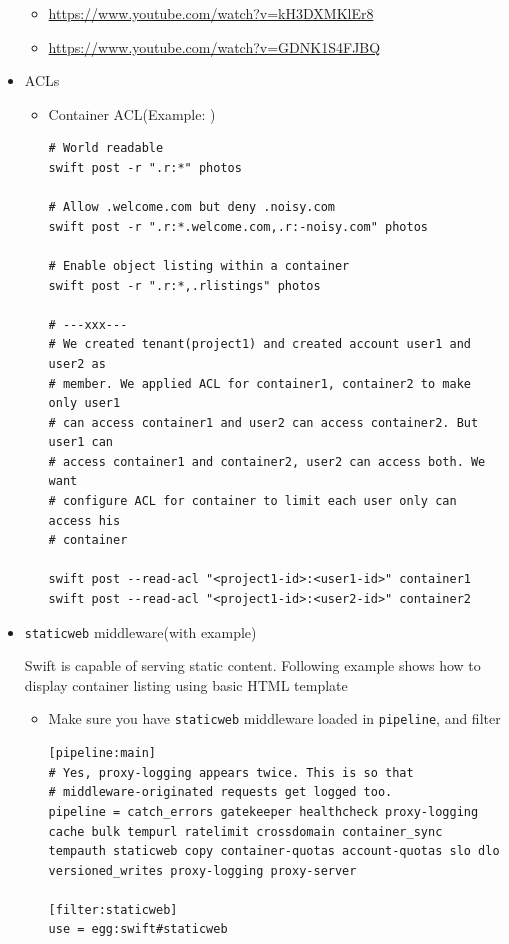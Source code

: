 \documentclass{article}
\begin{document}
\begin{itemize}
\begin{itemize}
\item \url{https://www.youtube.com/watch?v=kH3DXMKlEr8}
\item \url{https://www.youtube.com/watch?v=GDNK1S4FJBQ}
\end{itemize}

\item ACLs
\begin{itemize}
\item Container ACL(Example: )
\begin{verbatim}
# World readable
swift post -r ".r:*" photos

# Allow .welcome.com but deny .noisy.com
swift post -r ".r:*.welcome.com,.r:-noisy.com" photos

# Enable object listing within a container
swift post -r ".r:*,.rlistings" photos

# ---xxx---
# We created tenant(project1) and created account user1 and user2 as
# member. We applied ACL for container1, container2 to make only user1
# can access container1 and user2 can access container2. But user1 can
# access container1 and container2, user2 can access both. We want
# configure ACL for container to limit each user only can access his
# container

swift post --read-acl "<project1-id>:<user1-id>" container1
swift post --read-acl "<project1-id>:<user2-id>" container2
\end{verbatim}
\end{itemize}

\item \texttt{staticweb} middleware(with example)

Swift is capable of serving static content. Following example shows
how to display container listing using basic HTML template
\begin{itemize}
\item Make sure you have \texttt{staticweb} middleware loaded in \texttt{pipeline},
and filter
\begin{verbatim}
[pipeline:main]
# Yes, proxy-logging appears twice. This is so that
# middleware-originated requests get logged too.
pipeline = catch_errors gatekeeper healthcheck proxy-logging cache bulk tempurl ratelimit crossdomain container_sync tempauth staticweb copy container-quotas account-quotas slo dlo versioned_writes proxy-logging proxy-server

[filter:staticweb]
use = egg:swift#staticweb
\end{verbatim}


\end{itemize}
\end{itemize}
\end{document}
